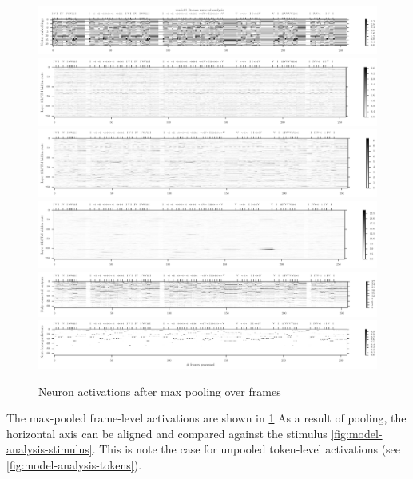 \begin{figure}[p]
    \centering
    \includegraphics[width=1.0\linewidth]{model-analysis-chords-0.pdf}
    \includegraphics[width=1.0\linewidth]{model-analysis-chords-1.pdf}
    \includegraphics[width=1.0\linewidth]{model-analysis-chords-2.pdf}
    \includegraphics[width=1.0\linewidth]{model-analysis-chords-3.pdf}
    \includegraphics[width=1.0\linewidth]{model-analysis-chords-4.pdf}
    \includegraphics[width=1.0\linewidth]{model-analysis-chords-5.pdf}
    \caption{Neuron activations after max pooling over frames}
    \label{fig:model-analysis-frames}
\end{figure}

The max-pooled frame-level activations are shown in
\cref{fig:model-analysis-frames} As a result of pooling, the horizontal axis
can be aligned and compared against the stimulus
\cref{fig:model-analysis-stimulus}.  This is note the case for unpooled
token-level activations (see \vref{fig:model-analysis-tokens}).

